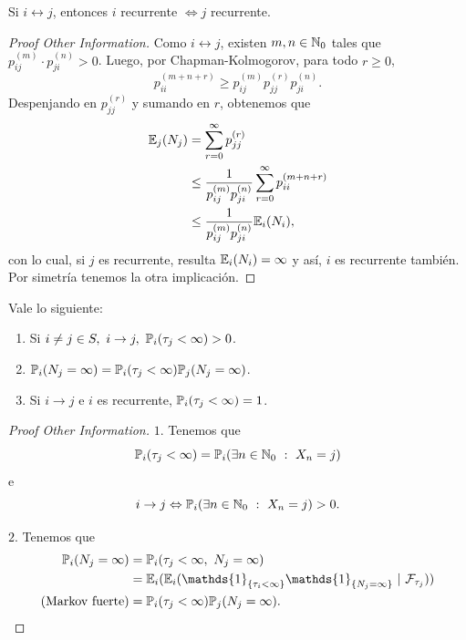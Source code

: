 \begin{prop}
	Si $i \leftrightarrow j$, entonces $i$ recurrente $\iff j$ recurrente.
\end{prop}
\begin{proof}[Proof Other Information]
	Como $i \leftrightarrow j$, existen $m,n \in \mathbb{N}_{0}$ tales que $p_{ij}^{(m)} \cdot p_{ji}^{(n)} > 0$. Luego, por Chapman-Kolmogorov, para todo $r \geq 0$,
	\[ p_{ii}^{(m+n+r)} \geq p_{ij}^{(m)} p_{jj}^{(r)} p_{ji}^{(n)}. \]
	Despenjando en $p_{jj}^{(r)}$ y sumando en $r$, obtenemos que 
	\begin{align*}
		\mathbb{E}_{j}(N_{j}) &= \sum_{r=0}^{\infty} p_{jj}^{(r)} \\
		&\leq \frac{1}{p_{ij}^{(m)} p_{ji}^{(n)}} \sum_{r=0}^{\infty} p_{ii}^{(m+n+r)} \\
		&\leq \frac{1}{p_{ij}^{(m)} p_{ji}^{(n)}} \mathbb{E}_{i}(N_{i})
	,\end{align*}
	con lo cual, si $j$ es recurrente, resulta $\mathbb{E}_{i}(N_{i}) = \infty$ y así, $i$ es recurrente también. Por simetría tenemos la otra implicación.
\end{proof}

\begin{prop}
	Vale lo siguiente:
	\begin{enumerate}
		\item Si $i \neq j \in S,\ i \to j,\ \mbb{P}_{i}(\tau_{j} < \infty) > 0$.

		\item $\mathbb{P}_{i}(N_{j} = \infty) = \mathbb{P}_{i}(\tau_{j} < \infty) \mathbb{P}_{j}(N_{j} = \infty)$.
		
		\item Si $i \to j$ e $i$ es recurrente, $\mathbb{P}_{i}(\tau_{j} < \infty) = 1$.
	\end{enumerate}
\end{prop}
\begin{proof}[Proof Other Information]
	$\boxed{1.}$ Tenemos que
	\[ \mathbb{P}_{i}(\tau_{j} < \infty) = \mathbb{P}_{i}(\exists n \in \mathbb{N}_{0} \ : \ X_{n} = j) \]
	e
	\[ i \to j \Leftrightarrow \mathbb{P}_{i}(\exists n \in \mathbb{N}_{0} \ : \ X_{n} = j) > 0. \]
	\par $\boxed{2.}$ Tenemos que
	\begin{align*}
		\mbb{P}_{i}(N_{j} = \infty) &= \mbb{P}_{i}(\tau_{j} < \infty,\ N_{j} = \infty) \\
		&= \mbb{E}_{i}(\mbb{E}_{i}(\mathds{1}_{\{\tau_{i} < \infty\}} \mathds{1}_{\{N_{j} = \infty\}} \ | \ \mcal{F}_{\tau_{j}})) \\
		(\text{Markov fuerte}) &= \mbb{P}_{i}(\tau_{j} < \infty) \mbb{P}_{j}(N_{j} = \infty)
	.\end{align*}
\end{proof}

